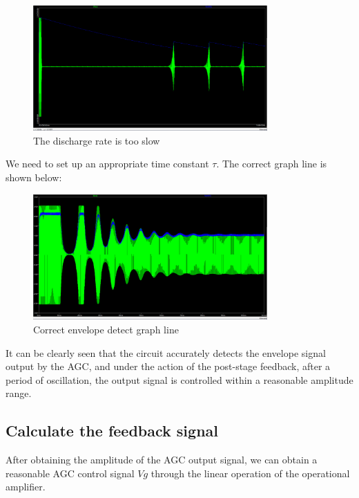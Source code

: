 \begin{figure}[H]
\centering
\includegraphics[width=0.8\textwidth]{./2023Mar/WaveEnvDectErr.png}
\caption{The discharge rate is too slow}
\label{WaveEnvDectErr}
\end{figure}

We need to set up an appropriate time constant $\tau$. The correct graph line is shown below:

\begin{figure}[H]
\centering
\includegraphics[width=0.8\textwidth]{./2023Mar/WaveEnvDect.png}
\caption{Correct envelope detect graph line}
\label{WaveEnvDect}
\end{figure}

It can be clearly seen that the circuit accurately detects the envelope signal output by the AGC, and under the action of the post-stage feedback, after a period of oscillation, the output signal is controlled within a reasonable amplitude range.

\subsection*{Calculate the feedback signal}

After obtaining the amplitude of the AGC output signal, we can obtain a reasonable AGC control signal $Vg$ through the linear operation of the operational amplifier.

